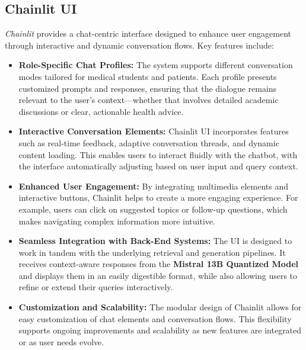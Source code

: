 \subsection{Chainlit UI}
\label{subsec:chainlit_ui}
\emph{Chainlit} provides a chat-centric interface designed to enhance user engagement through interactive and dynamic conversation flows. Key features include:
\begin{itemize}[itemsep=2em]
    \item \textbf{Role-Specific Chat Profiles:} The system supports different conversation modes tailored for medical students and patients. Each profile presents customized prompts and responses, ensuring that the dialogue remains relevant to the user's context—whether that involves detailed academic discussions or clear, actionable health advice.
    \item \textbf{Interactive Conversation Elements:} Chainlit UI incorporates features such as real-time feedback, adaptive conversation threads, and dynamic content loading. This enables users to interact fluidly with the chatbot, with the interface automatically adjusting based on user input and query context.
    \item \textbf{Enhanced User Engagement:} By integrating multimedia elements and interactive buttons, Chainlit helps to create a more engaging experience. For example, users can click on suggested topics or follow-up questions, which makes navigating complex information more intuitive.
    \item \textbf{Seamless Integration with Back-End Systems:} The UI is designed to work in tandem with the underlying retrieval and generation pipelines. It receives context-aware responses from the \textbf{Mistral 13B Quantized Model} and displays them in an easily digestible format, while also allowing users to refine or extend their queries interactively.
    \item \textbf{Customization and Scalability:} The modular design of Chainlit allows for easy customization of chat elements and conversation flows. This flexibility supports ongoing improvements and scalability as new features are integrated or as user needs evolve.
\end{itemize}

\vspace{5cm}
